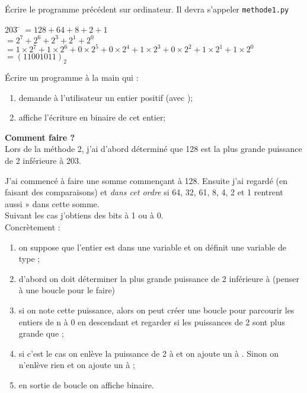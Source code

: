 \documentclass[a4paper,12pt,french]{book}
\begin{document}
\begin{exercice}[]
	\'Ecrire le programme précédent sur ordinateur. Il devra s'appeler \texttt{methode1.py}
\end{exercice}

\begin{methode}
\begin{tabbing}
	203	\= 	$=128+64+8+2+1$	\\
	
		\>	$=2^7+2^6+2^3+2^1+2^0$	\\
		
		\>	$=1\times 2^7+1\times 2^6+0\times 2^5 + 0\times 2^4 +1\times 2^3+0\times 2^2 + 1\times 
		2^1+1\times 2^0$	\\
		
		\> $=(11001011)_2$
\end{tabbing}
\end{methode}

\begin{exercice}[]
\'Ecrire un programme à la main qui :
\begin{enumerate}[--]
	\item 	demande à l'utilisateur un entier positif (avec );
	\item 	affiche l'écriture en binaire de cet entier;\\
\end{enumerate}

\textbf{Comment faire ?}\\

Lors de la méthode 2, j'ai d'abord déterminé que 128 est la plus grande puissance de 2 inférieure à 203.

J'ai commencé à faire une somme commençant à 128. Ensuite j'ai regardé (en faisant des comparaisons) et \textit{dans cet ordre} si 64, 32, 61, 8, 4, 2 et 1 \og rentrent aussi »  dans cette somme.\\
Suivant les cas j'obtiens des bits à 1 ou à 0.\\
Concrètement :
\begin{enumerate}[--]
	\item 	on suppose que l'entier est dans une variable  et on définit une variable de type ;
	\item 	d'abord on doit déterminer la plus grande puissance de 2 inférieure à  (penser à une boucle pour le faire)
	\item 	si on note  cette puissance, alors on peut créer une boucle pour parcourir les entiers de n à 0 en descendant et regarder si les puissances de 2 sont plus grande que ;
	\item 	si c'est le cas on enlève la puissance de 2 à  et on ajoute un  à . Sinon on n'enlève rien et on ajoute un  à ;
	\item 	en sortie de boucle on affiche binaire.
\end{enumerate}
\end{exercice}
\end{document}

